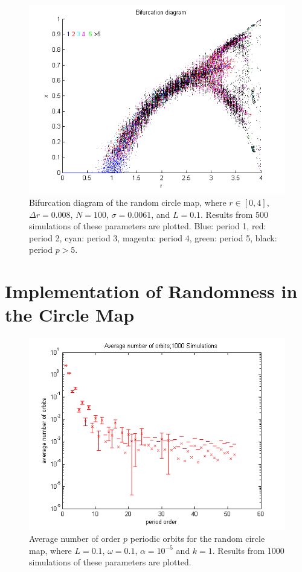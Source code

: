 \begin{figure}[!h]
\caption[Bifurcation diagram of the random logistic map]{Bifurcation diagram of the random
circle map, where $r \in [0,4]$, $\Delta r = 0.008$, $N=100$, $\sigma
= 0.0061$, and $L=0.1$. Results from 500
simulations of these parameters are plotted. Blue: period 1, red:
period 2, cyan: period 3, magenta: period 4, green: period 5, black:
period $p > 5$.}
	\begin{center}
		\includegraphics[scale=0.7]{figs/rlog_bif_r500_x10_L01.png}
	\end{center}
\end{figure}

\section{Implementation of Randomness in the Circle Map}
\begin{figure}[!h]
\caption[Average number of order $p$ orbits for the random circle
map]{Average number of order $p$ periodic orbits for the random circle
map, where $L=0.1$, $\omega =0.1$, $\alpha = 10^{-5}$ and $k=1$. Results from 1000
simulations of these parameters are plotted.}
	\begin{center}
		\includegraphics[scale=0.7]{figs/rcirc_avg_num_1000_sim_logscale.png}
	\end{center}
\end{figure}

